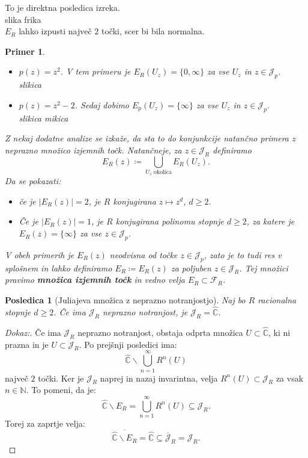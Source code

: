 \documentclass{article}
\newtheorem{posledica}{Posledica}
\newtheorem{primer}{Primer}
\newcommand{\C}{\mathbb{C}}
\newcommand{\N}{\mathbb{N}}
\newcommand{\F}{\mathcal{F}}
\begin{document}
To je direktna posledica izreka.\\
slika frika\\
$E_R$ lahko izpusti največ $2$ točki, scer bi bila normalna.

\begin{primer}
    \hfill
\begin{itemize}
    \item $p(z) = z^2$. V tem primeru je $E_R(U_z) = \{0, \infty\}$ za vse 
    $U_z$ in $z\in \mathcal{J}_p$.\\
    slikica
    \item $p(z) = z^2 - 2$. Sedaj dobimo $E_p(U_z) = \{\infty \}$ za vse 
    $U_z$ in $z\in \mathcal{J}_p$.\\
    slikica mikica
\end{itemize}
Z nekaj dodatne analize se izkaže, da sta to do konjunkcije natančno 
primera z neprazno množico izjemnih točk. Natančneje, za $z\in \mathcal{J}_R$ 
definiramo 
$$
E_R(z) \coloneqq \bigcup_{U_z \text{ okolica}} E_R(U_z). 
$$
Da se pokazati:
\begin{itemize}
    \item če je $|E_R(z)| = 2$, je $R$ konjugirana $z \mapsto z^d$, $d \geq 2$.
    \item Če je $|E_R(z)| = 1$, je $R$ konjugirana polinomu stopnje $d \geq 2$, 
    za katere je $E_R(z) = \{\infty\}$ za vse $z\in \mathcal{J}_p$. 
\end{itemize}
V obeh primerih je $E_R(z)$ neodvisna od točke $z\in \mathcal{J}_p$,
zato je to tudi res v splošnem in lahko definiramo $E_R \coloneqq E_R(z)$
za poljuben $z\in \mathcal{J}_R$. Tej množici pravimo \textbf{množica izjemnih 
točk} in vedno velja $E_R \subset \F_R$.
\end{primer}

\begin{posledica}[Juliajeva množica z neprazno notranjostjo]
Naj bo $R$ racionalna stopnje $d \geq 2$. Če ima $\mathcal{J}_R$
 neprazno notranjost, je $\mathcal{J}_R = \hat{\C}$.
\end{posledica}

\begin{proof}[Dokaz:]
Če ima $\mathcal{J}_R$ neprazno notranjost, obstaja odprta množica 
$U \subset \hat{\C}$, ki ni prazna in je $U \subset\mathcal{J}_R$. 
Po prejšnji posledici ima:
$$
\hat{\C} \backslash \bigcup_{n=1}^\infty R^n(U)
$$
največ $2$ točki. Ker je $\mathcal{J}_R$ naprej in nazaj invarintna, 
velja $R^n(U) \subset \mathcal{J}_R$ za vsak $n\in \N$. To pomeni, da je:
$$
\hat{\C} \backslash E_R = \bigcup_{n=1}^\infty R^n(U) \subseteq \mathcal{J}_R. 
$$
Torej za zaprtje velja:
$$
\overline{\hat{\C} \backslash E_R} = \hat{\C} \subseteq \overline{\mathcal{J}}_R = \mathcal{J}_R.
$$
\end{proof}
\end{document}

